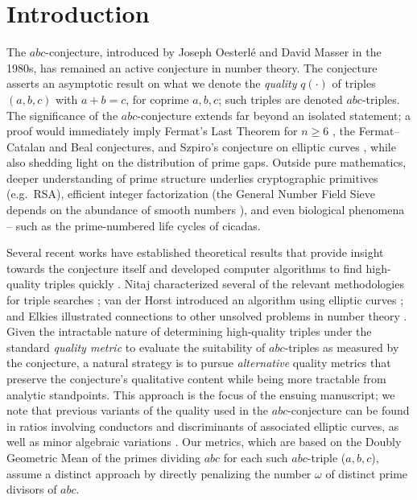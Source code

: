 \documentclass[11pt,letterpaper]{amsart}
\begin{document}
\section{Introduction}

The $abc$-conjecture, introduced by Joseph Oesterl\'e \cite{oesterle1988} and David Masser \cite{masser1985} in the 1980s, has remained an active conjecture in number theory. The conjecture asserts an asymptotic result on what we denote the \textit{quality} $q(\cdot)$ of triples $(a, b, c)$ with $a + b = c$, for coprime $a, b, c$; such triples are denoted $abc$-triples. The significance of the $abc$-conjecture extends far beyond an isolated statement; a proof would immediately imply Fermat's Last Theorem for $n\ge 6$ \cite{wiles1995, waldschmidt2015}, the Fermat--Catalan and Beal conjectures, and Szpiro's conjecture on elliptic curves \cite{waldschmidt2015}, while also shedding light on the distribution of prime gaps. Outside pure mathematics, deeper understanding of prime structure underlies cryptographic primitives (e.g.\ RSA), efficient integer factorization (the General Number Field Sieve depends on the abundance of smooth numbers \cite{gnfs}), and even biological phenomena – such as the prime-numbered life cycles of cicadas. 

Several recent works have established theoretical results that provide insight towards the conjecture itself \cite{granville2002} and developed computer algorithms to find high-quality triples quickly \cite{desmit2022, nitaj1993-algorithms, nitaj1993-an}. Nitaj characterized several of the relevant methodologies for triple searches \cite{nitaj2022}; van der Horst introduced an algorithm using elliptic curves \cite{horst2010}; and Elkies illustrated connections to other unsolved problems in number theory \cite{elkies2007}. Given the intractable nature of determining high-quality triples under the standard \textit{quality metric} to evaluate the suitability of $abc$-triples as measured by the conjecture, a natural strategy is to pursue \emph{alternative} quality metrics that preserve the conjecture's qualitative content while being more tractable from analytic standpoints. This approach is the focus of the ensuing manuscript; we note that previous variants of the quality used in the $abc$-conjecture can be found in ratios involving conductors and discriminants of associated elliptic curves, as well as minor algebraic variations \cite{waldschmidt2015, horst2010, martin2016}. Our metrics, which are based on the Doubly Geometric Mean of the primes dividing $abc$ for each such $abc$-triple ($a, b, c$), assume a distinct approach by directly penalizing the number $\omega$ of distinct prime divisors of $abc$.
\end{document}
